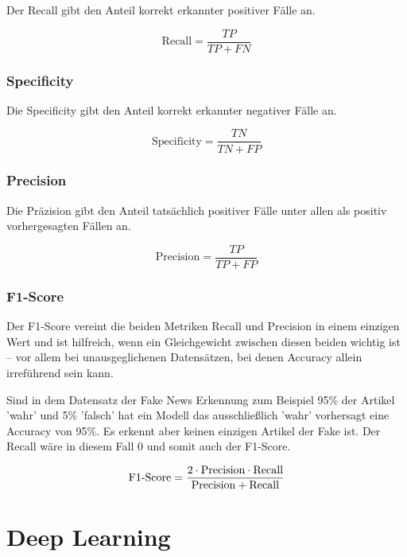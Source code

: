 Der Recall gibt den Anteil korrekt erkannter positiver Fälle an.

\begin{equation}
    \text{Recall} = \frac{TP}{TP + FN}
\end{equation}

\subsubsection{Specificity}

Die Specificity gibt den Anteil korrekt erkannter negativer Fälle an.

\begin{equation}
    \text{Specificity} = \frac{TN}{TN + FP}
\end{equation}

\subsubsection{Precision}

Die Präzision gibt den Anteil tatsächlich positiver Fälle unter allen als positiv vorhergesagten Fällen an.

\begin{equation}
    \text{Precision} = \frac{TP}{TP + FP}
\end{equation}

\subsubsection{F1-Score}

Der F1-Score vereint die beiden Metriken Recall und Precision in einem einzigen Wert und ist hilfreich, wenn ein Gleichgewicht zwischen 
diesen beiden wichtig ist – vor allem bei unausgeglichenen Datensätzen, bei denen Accuracy allein irreführend sein kann.

Sind in dem Datensatz der Fake News Erkennung zum Beispiel 95\% der Artikel 'wahr' und 5\% 'falsch' hat ein Modell das ausschließlich
'wahr' vorhersagt eine Accuracy von 95\%. Es erkennt aber keinen einzigen Artikel der Fake ist.
Der Recall wäre in diesem Fall 0 und somit auch der F1-Score.

\begin{equation}
\text{F1\text{-}Score} = \frac{2 \cdot \text{Precision} \cdot \text{Recall}}{\text{Precision} + \text{Recall}}
\end{equation}


\section{Deep Learning}
\label{sec:deep_learning}

